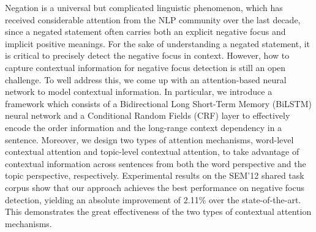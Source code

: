 Negation is a universal but complicated linguistic phenomenon, which has received considerable attention from the NLP community over the last decade, since a negated statement often carries both an explicit negative focus and implicit positive meanings. For the sake of understanding a negated statement, it is critical to precisely detect the negative focus in context. However, how to capture contextual information for negative focus detection is still an open challenge. To well address this, we come up with an attention-based neural network to model contextual information. In particular, we introduce a framework which consists of a Bidirectional Long Short-Term Memory (BiLSTM) neural network and a Conditional Random Fields (CRF) layer to effectively encode the order information and the long-range context dependency in a sentence. Moreover, we design two types of attention mechanisms, word-level contextual attention and topic-level contextual attention, to take advantage of contextual information across sentences from both the word perspective and the topic perspective, respectively. Experimental results on the SEM'12 shared task corpus show that our approach achieves the best performance on negative focus detection, yielding an absolute improvement of 2.11\% over the state-of-the-art. This demonstrates the great effectiveness of the two types of contextual attention mechanisms.
